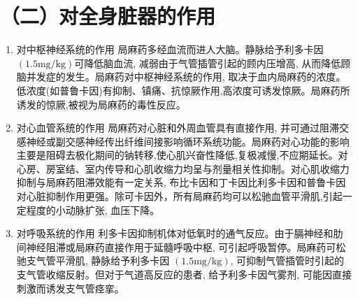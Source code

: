 \documentclass[10pt]{article}
\begin{document}
\section*{（二）对全身脏器的作用}
\begin{enumerate}
  \item 对中枢神经系统的作用 局麻药多经血流而进人大脑。静脉给予利多卡因 $(1.5 \mathrm{mg} / \mathrm{kg})$可降低脑血流, 减弱由于气管插管引起的顾内压增高, 从而降低顾脑并发症的发生。局麻药对中枢神经系统的作用, 取决于血内局麻药的浓度。低浓度(如普鲁卡因)有抑制、镇痛、抗惊厥作用,高浓度可诱发惊厥。局麻药所诱发的惊厥,被视为局麻药的毒性反应。

  \item 对心血管系统的作用 局麻药对心脏和外周血管具有直接作用, 并可通过阻滞交感神经或副交感神经传出纤维间接影响循环系统功能。局麻药对心功能的影响主要是阻碍去极化期间的钠转移,使心肌兴奋性降低,复极减慢,不应期延长。对心房、房室结、室内传导和心肌收缩力均呈与剂量相关性抑制。对心肌收缩力抑制与局麻药阻滞效能有一定关系, 布比卡因和丁卡因比利多卡因和普鲁卡因对心脏抑制作用更强。除可卡因外，所有局麻药均可以松驰血管平滑肌,引起一定程度的小动脉扩张, 血压下降。

  \item 对呼吸系统的作用 利多卡因抑制机体对低氧时的通气反应。由于膈神经和肋间神经阻滞或局麻药直接作用于延髓呼吸中枢, 可引起呼吸暂停。局麻药可松驰支气管平滑肌, 静脉给予利多卡因 $(1.5 \mathrm{mg} / \mathrm{kg})$, 可抑制气管插管时引起的支气管收缩反射。但对于气道高反应的患者, 给予利多卡因气雾剂, 可能因直接刺激而诱发支气管痉挛。

\end{enumerate}
\end{document}
